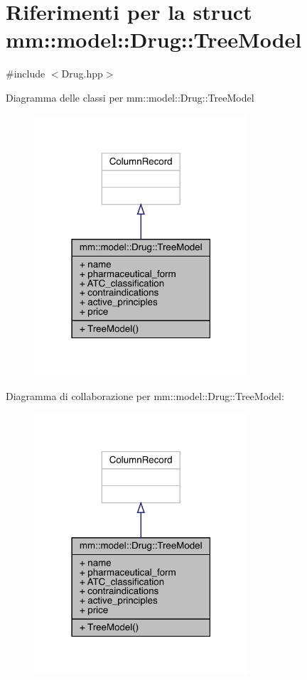 \hypertarget{structmm_1_1model_1_1_drug_1_1_tree_model}{}\section{Riferimenti per la struct mm\+:\+:model\+:\+:Drug\+:\+:Tree\+Model}
\label{structmm_1_1model_1_1_drug_1_1_tree_model}


{\ttfamily \#include $<$Drug.\+hpp$>$}



Diagramma delle classi per mm\+:\+:model\+:\+:Drug\+:\+:Tree\+Model
\nopagebreak
\begin{figure}[H]
\begin{center}
\leavevmode
\includegraphics[width=226pt]{db/d60/structmm_1_1model_1_1_drug_1_1_tree_model__inherit__graph}
\end{center}
\end{figure}


Diagramma di collaborazione per mm\+:\+:model\+:\+:Drug\+:\+:Tree\+Model\+:
\nopagebreak
\begin{figure}[H]
\begin{center}
\leavevmode
\includegraphics[width=226pt]{d9/d7b/structmm_1_1model_1_1_drug_1_1_tree_model__coll__graph}
\end{center}
\end{figure}
